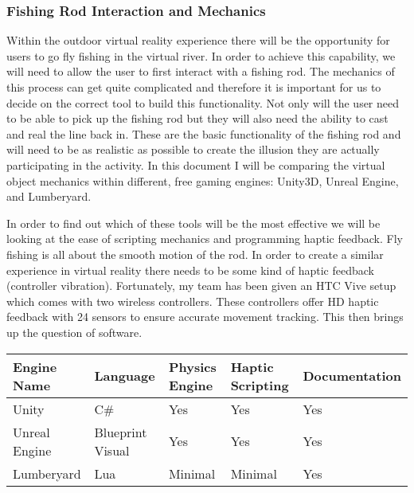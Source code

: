 \documentclass[10pt,journal,compsoc,onecolumn, draftclsnofoot]{IEEEtran}
\begin{document}
\subsubsection{Fishing Rod Interaction and Mechanics}
Within the outdoor virtual reality experience there will be the opportunity for users to go fly fishing in the virtual river.
In order to achieve this capability, we will need to allow the user to first interact with a fishing rod.
The mechanics of this process can get quite complicated and therefore it is important for us to decide on the correct tool to build this functionality.
Not only will the user need to be able to pick up the fishing rod but they will also need the ability to cast and real the line back in.
These are the basic functionality of the fishing rod and will need to be as realistic as possible to create the illusion they are actually participating in the activity.
In this document I will be comparing the virtual object mechanics within different, free gaming engines: Unity3D, Unreal Engine, and Lumberyard.

In order to find out which of these tools will be the most effective we will be looking at the ease of scripting mechanics and programming haptic feedback.
Fly fishing is all about the smooth motion of the rod.
In order to create a similar experience in virtual reality there needs to be some kind of haptic feedback (controller vibration).
Fortunately, my team has been given an HTC Vive setup which comes with two wireless controllers.
These controllers offer HD haptic feedback with 24 sensors to ensure accurate movement tracking\cite{htc_corporation}.
This then brings up the question of software.

\vspace{2mm}
\begin{table}[h!]
\centering
  \begin{tabu} to 1.0\textwidth { | X[l] || X[c] | X[c] | X[c] | X[c] |  }
  \hline
  Engine Name & Language & Physics Engine & Haptic Scripting & Documentation\\
  \hline
  Unity  & C\# & Yes & Yes & Yes\\
  Unreal Engine &   Blueprint Visual  & Yes & Yes & Yes\\
  Lumberyard & Lua & Minimal & Minimal & Yes \\
  \hline
  \end{tabu}
\end{table}
\vspace{2mm}
\end{document}
